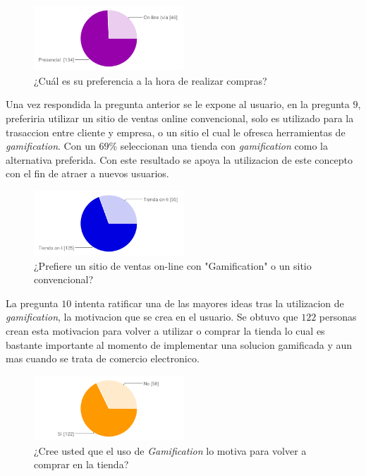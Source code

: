 \begin{figure}[!htb]
  \centering
  \includegraphics[width=0.5\textwidth]{images/chartPreg8.png}
  \caption[chart8]{¿Cuál es su preferencia a la hora de realizar compras?}
  \label{fig:chart2}
\end{figure}

Una vez respondida la pregunta anterior se le expone al usuario, en la pregunta $9$,  preferiria
utilizar un sitio de ventas online convencional, solo es utilizado para la trasaccion entre cliente
y empresa, o un sitio el cual le ofresca herramientas de \emph{gamification}. Con un $69\%$ seleccionan
una tienda con \emph{gamification} como la alternativa preferida. Con este resultado se apoya la
utilizacion de este concepto con el fin de atraer a nuevos usuarios.

\begin{figure}[!htb]
  \centering
  \includegraphics[width=0.5\textwidth]{images/chartPreg9.png}
  \caption[chart9]{¿Prefiere un sitio de ventas on-line con "Gamification" o un sitio convencional?}
  \label{fig:chart2}
\end{figure}

La pregunta $10$ intenta ratificar una de las mayores ideas tras la utilizacion de \emph{gamification},
la motivacion que se crea en el usuario. Se obtuvo que $122$ personas crean esta motivacion
para volver a utilizar o comprar la tienda lo cual es bastante importante al momento de implementar
una solucion gamificada y aun mas cuando se trata de comercio electronico.

\begin{figure}[!htb]
  \centering
  \includegraphics[width=0.5\textwidth]{images/chartPreg10.png}
  \caption[chart10]{¿Cree usted que el uso de \emph{Gamification} lo motiva para volver a comprar en la tienda?}
  \label{fig:chart2}
\end{figure}


